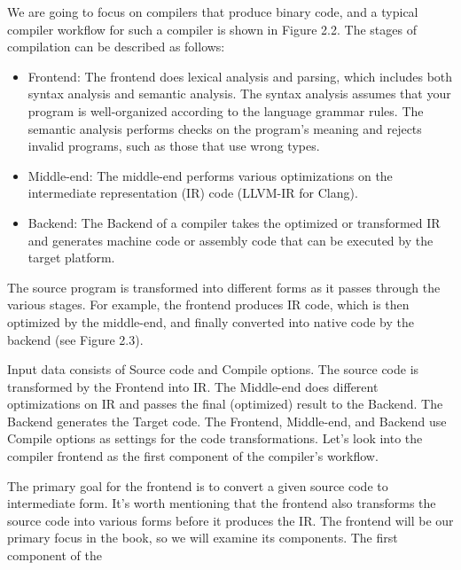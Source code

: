 We are going to focus on compilers that produce binary code, and a typical compiler workflow for such a compiler is shown in Figure 2.2. The stages of compilation can be described as follows:

\begin{itemize}
\item
Frontend: The frontend does lexical analysis and parsing, which includes both syntax analysis and semantic analysis. The syntax analysis assumes that your program is well-organized according to the language grammar rules. The semantic analysis performs checks on the program's meaning and rejects invalid programs, such as those that use wrong types.

\item
Middle-end: The middle-end performs various optimizations on the intermediate representation (IR) code (LLVM-IR for Clang).

\item
Backend: The Backend of a compiler takes the optimized or transformed IR and generates machine code or assembly code that can be executed by the target platform.
\end{itemize}

The source program is transformed into different forms as it passes through the various stages. For example, the frontend produces IR code, which is then optimized by the middle-end, and finally converted into native code by the backend (see Figure 2.3).


Input data consists of Source code and Compile options. The source code is transformed by the Frontend into IR. The Middle-end does different optimizations on IR and passes the final (optimized) result to the Backend. The Backend generates the Target code. The Frontend, Middle-end, and Backend use Compile options as settings for the code transformations. Let's look into the compiler frontend as the first component of the compiler's workflow.


The primary goal for the frontend is to convert a given source code to intermediate form. It's worth mentioning that the frontend also transforms the source code into various forms before it produces the IR. The frontend will be our primary focus in the book, so we will examine its components. The first component of the

